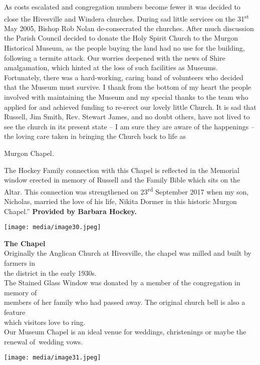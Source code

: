 As costs escalated and congregation numbers become fewer it was decided
to close the Hivesville and Windera churches. During sad little services
on the 31\textsuperscript{st} May 2005, Bishop Rob Nolan de-consecrated
the churches. After much discussion the Parish Council decided to donate
the Holy Spirit Church to the Murgon Historical Museum, as the people
buying the land had no use for the building, following a termite attack.
Our worries deepened with the news of Shire amalgamation, which hinted
at the loss of such facilities as Museums. Fortunately, there was a
hard-working, caring band of volunteers who decided that the Museum must
survive. I thank from the bottom of my heart the people involved with
maintaining the Museum and my special thanks to the team who applied for
and achieved funding to re-erect our lovely little Church. It is sad
that Russell, Jim Smith, Rev. Stewart James, and no doubt others, have
not lived to see the church in its present state -- I am sure they are
aware of the happenings -- the loving care taken in bringing the Church
back to life as

Murgon Chapel.

The Hockey Family connection with this Chapel is reflected in the
Memorial window erected in memory of Russell and the Family Bible which
sits on the Altar. This connection was strengthened on
23\textsuperscript{rd} September 2017 when my son, Nicholas, married the
love of his life, Nikita Dormer in this historic Murgon Chapel.''
\textbf{Provided by Barbara Hockey.}

\texttt{[image: media/image30.jpeg]}

\textbf{The Chapel}\\
Originally the Anglican Church at Hivesville, the chapel was milled and
built by farmers in\\
the district in the early 1930s.\\
The Stained Glass Window was donated by a member of the congregation in
memory of\\
members of her family who had passed away. The original church bell is
also a feature\\
which visitors love to ring.\\
Our Museum Chapel is an ideal venue for weddings, christenings or maybe
the renewal of~wedding vows.

\texttt{[image: media/image31.jpeg]}
